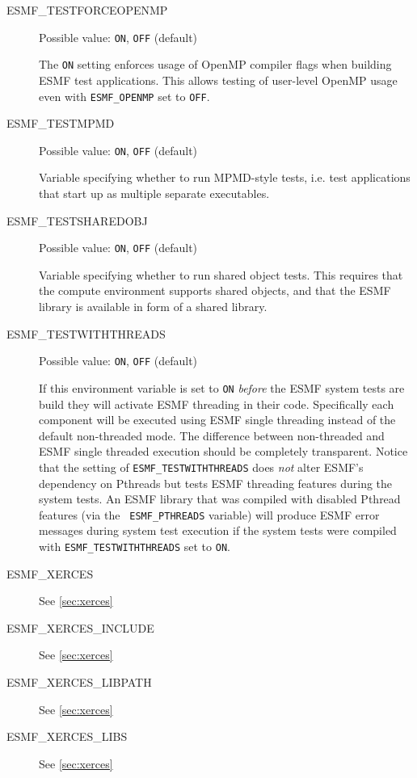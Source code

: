 \begin{description}
\item[ESMF\_TESTFORCEOPENMP] 
Possible value: {\tt ON}, {\tt OFF} (default)

The {\tt ON} setting enforces usage of OpenMP compiler flags when building ESMF test applications. This allows testing of user-level OpenMP usage even with {\tt ESMF\_OPENMP} set to {\tt OFF}.

\item[ESMF\_TESTMPMD] 
Possible value: {\tt ON}, {\tt OFF} (default)

Variable specifying whether to run MPMD-style tests, i.e. test applications
that start up as multiple separate executables.

\item[ESMF\_TESTSHAREDOBJ]
Possible value: {\tt ON}, {\tt OFF} (default)

Variable specifying whether to run shared object tests. This requires that the compute environment supports shared objects, and that the ESMF library is available in form of a shared library.

\item[ESMF\_TESTWITHTHREADS]
Possible value: {\tt ON}, {\tt OFF} (default)

If this environment variable is set to {\tt ON} {\em before} the ESMF system
tests are build they will activate ESMF threading in their code. Specifically
each component will be executed using ESMF single threading instead of the
default non-threaded mode. The difference between non-threaded and ESMF
single threaded execution should be completely transparent. Notice that the
setting of {\tt ESMF\_TESTWITHTHREADS} does {\em not} alter ESMF's dependency
on Pthreads but tests ESMF threading features during the system tests. An
ESMF library that was compiled with disabled Pthread features (via the {\tt
ESMF\_PTHREADS} variable) will produce ESMF error messages during system test
execution if the system tests were compiled with {\tt ESMF\_TESTWITHTHREADS}
set to {\tt ON}.

\item[ESMF\_XERCES]
See \ref{sec:xerces}

\item[ESMF\_XERCES\_INCLUDE]
See \ref{sec:xerces}

\item[ESMF\_XERCES\_LIBPATH]
See \ref{sec:xerces}

\item[ESMF\_XERCES\_LIBS]
See \ref{sec:xerces}

\end{description}

